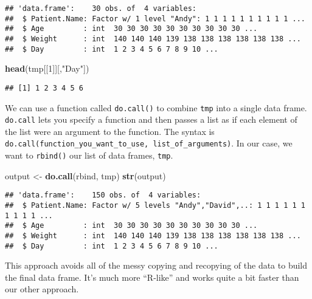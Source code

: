 \documentclass[
]{article}
\newenvironment{Shaded}{\begin{snugshade}}{\end{snugshade}}
\newcommand{\DecValTok}[1]{\textcolor[rgb]{0.00,0.00,0.81}{#1}}
\newcommand{\KeywordTok}[1]{\textcolor[rgb]{0.13,0.29,0.53}{\textbf{#1}}}
\newcommand{\NormalTok}[1]{#1}
\newcommand{\StringTok}[1]{\textcolor[rgb]{0.31,0.60,0.02}{#1}}
\begin{document}
\begin{verbatim}
## 'data.frame':    30 obs. of  4 variables:
##  $ Patient.Name: Factor w/ 1 level "Andy": 1 1 1 1 1 1 1 1 1 1 ...
##  $ Age         : int  30 30 30 30 30 30 30 30 30 30 ...
##  $ Weight      : int  140 140 140 139 138 138 138 138 138 138 ...
##  $ Day         : int  1 2 3 4 5 6 7 8 9 10 ...
\end{verbatim}

\begin{Shaded}
\begin{Highlighting}[]
\KeywordTok{head}\NormalTok{(tmp[[}\DecValTok{1}\NormalTok{]][,}\StringTok{"Day"}\NormalTok{])}
\end{Highlighting}
\end{Shaded}

\begin{verbatim}
## [1] 1 2 3 4 5 6
\end{verbatim}

We can use a function called \texttt{do.call()} to combine \texttt{tmp}
into a single data frame. \texttt{do.call} lets you specify a function
and then passes a list as if each element of the list were an argument
to the function. The syntax is
\texttt{do.call(function\_you\_want\_to\_use,\ list\_of\_arguments)}. In
our case, we want to \texttt{rbind()} our list of data frames,
\texttt{tmp}.

\begin{Shaded}
\begin{Highlighting}[]
\NormalTok{output <-}\StringTok{ }\KeywordTok{do.call}\NormalTok{(rbind, tmp)}
\KeywordTok{str}\NormalTok{(output)}
\end{Highlighting}
\end{Shaded}

\begin{verbatim}
## 'data.frame':    150 obs. of  4 variables:
##  $ Patient.Name: Factor w/ 5 levels "Andy","David",..: 1 1 1 1 1 1 1 1 1 1 ...
##  $ Age         : int  30 30 30 30 30 30 30 30 30 30 ...
##  $ Weight      : int  140 140 140 139 138 138 138 138 138 138 ...
##  $ Day         : int  1 2 3 4 5 6 7 8 9 10 ...
\end{verbatim}

This approach avoids all of the messy copying and recopying of the data
to build the final data frame. It's much more ``R-like'' and works quite
a bit faster than our other approach.
\end{document}
